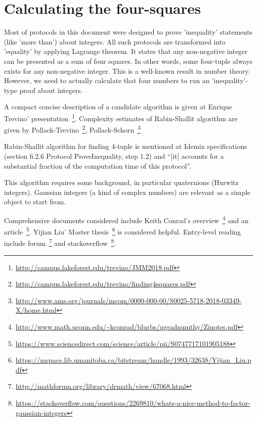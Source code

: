 \documentclass[a4paper,12pt]{article}
\begin{document}
\section{Calculating the four-squares} %

Most of protocols in this document were designed to prove 'inequality' statements (like 'more than') about integers.
All such protocols are transformed into 'equality' by applying Lagrange theorem.
It states that any non-negative integer can be presented as a sum of four squares.
In other words, some four-tuple always exists for any non-negative integer.
This is a well-known result in number theory.
However, we need to actually calculate that four numbers to run an 'inequality'-type proof about integers.

A compact concise description of a candidate algorithm is given at Enrique Trevino' presentation~\footnote{\url{http://campus.lakeforest.edu/trevino/JMM2018.pdf}}.
Complexity estimates of Rabin-Shallit algorithm are given by Pollack-Trevino~\footnote{\url{http://campus.lakeforest.edu/trevino/finding4squares.pdf}},
Pollack-Schorn~\footnote{\url{http://www.ams.org/journals/mcom/0000-000-00/S0025-5718-2018-03349-X/home.html}}
%

Rabin-Shallit algorithm for finding 4-tuple is mentioned at Idemix specifications %
(section 6.2.6 Protocol ProveInequality, step 1.2)
and ``[it] accounts for a substantial fraction of the computation time of this protocol''.

This algorithm requires some background, in particular quaternions (Hurwitz integers).
Gaussian integers (a kind of complex numbers) are relevant as a simple object to start from.

Comprehensive documents considered include
Keith Conrad's overview~\footnote{\url{http://www.math.uconn.edu/~kconrad/blurbs/ugradnumthy/Zinotes.pdf}}
and an article~\footnote{\url{https://www.sciencedirect.com/science/article/pii/S0747717101905188}}.
%
Yijian Liu' Master thesis~\footnote{\url{https://mspace.lib.umanitoba.ca/bitstream/handle/1993/32638/Yijian_Liu.pdf}} is considered helpful.
%
Entry-level reading include
forum~\footnote{\url{http://mathforum.org/library/drmath/view/67068.html}}
and stackoverflow~\footnote{\url{https://stackoverflow.com/questions/2269810/whats-a-nice-method-to-factor-gaussian-integers}}.
\end{document}
